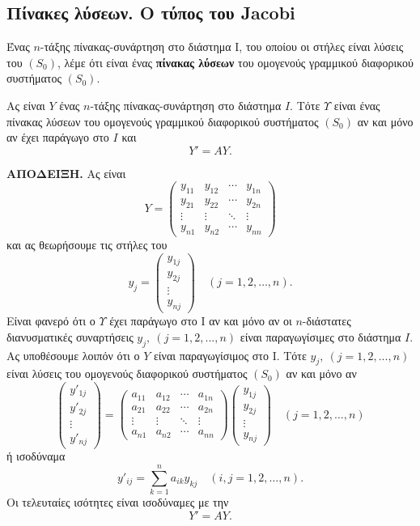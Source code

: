 \documentclass[11pt,a4paper,twoside]{book}
\newcommand{\titlefont}[1]{{\fontfamily{maksf}\selectfont #1}}
\newcounter{thewrhma}[chapter]
\renewcommand{\thethewrhma}{\thechapter.\arabic{thewrhma}}
\newcommand{\thewr}{\refstepcounter{thewrhma}{\bf\titlefont{\textcolor{secondarycolor}{\large Θεώρημα\hspace{2mm}\thethewrhma}}}\hspace{1mm}}{}
\newenvironment{Thewrhma}[1]
{\begin{tcolorbox}[title=\thewr\ \ :\ \  {\textcolor{black}{\bf{\large\titlefont{#1}}}},
breakable,
enhanced standard,
titlerule=-.2pt,
toprule=0pt, 
rightrule=0pt, 
bottomrule=0pt,
colback=white,
left=2mm,
top=1mm,
bottom=0mm,
boxrule=0pt,
colframe=white,
borderline west={1.5mm}{0pt}{secondarycolor},
leftrule=2mm,
sharp corners,
coltitle=secondarycolor]}
{\end{tcolorbox}}
\newcommand{\eng}[1]{\selectlanguage{english}#1\selectlanguage{greek}}
\begin{document}
\subsection{Πίνακες λύσεων. Ο τύπος του \eng{Jacobi}}
Ένας $n$-τάξης πίνακας-συνάρτηση στο διάστημα Ι, του οποίου οι στήλες είναι λύσεις του $(S_0)$, λέμε ότι είναι ένας \textbf{πίνακας λύσεων} του ομογενούς γραμμικού διαφορικού συστήματος $(S_0)$.
\begin{Thewrhma}{}
Ας είναι $Y$ ένας $n$-τάξης πίνακας-συνάρτηση στο διάστημα $Ι$. Τότε $Υ$ είναι ένας πίνακας λύσεων του ομογενούς γραμμικού διαφορικού συστήματος $(S_0)$ αν και μόνο αν έχει παράγωγο στο $Ι$ και
\[ Y' = AY. \]
\end{Thewrhma}

\textbf{ΑΠΟΔΕΙΞΗ.} Ας είναι
\[
Y = \begin{pmatrix}
y_{11} & y_{12} & \cdots & y_{1n} \\
y_{21} & y_{22} & \cdots & y_{2n} \\
\vdots & \vdots & \ddots & \vdots \\
y_{n1} & y_{n2} & \cdots & y_{nn}
\end{pmatrix}
\]
και ας θεωρήσουμε τις στήλες του
\[
y_j = \begin{pmatrix}
y_{1j} \\ y_{2j} \\ \vdots \\ y_{nj}
\end{pmatrix}
\quad (j=1,2,\dots,n).
\]
Είναι φανερό ότι ο $Υ$ έχει παράγωγο στο Ι αν και μόνο αν οι $n$-διάστατες διανυσματικές συναρτήσεις $y_j,\ (j=1,2,...,n)$ είναι παραγωγίσιμες στο διάστημα $Ι$. Ας υποθέσουμε λοιπόν ότι ο $Y$ είναι παραγωγίσιμος στο Ι. Τότε $y_j,\ (j=1,2,...,n)$ είναι λύσεις του ομογενούς διαφορικού συστήματος $(S_0)$ αν και μόνο αν
\[
\begin{pmatrix}
y'_{1j} \\ y'_{2j} \\ \vdots \\ y'_{nj}
\end{pmatrix}
=
\begin{pmatrix}
a_{11} & a_{12} & \cdots & a_{1n} \\
a_{21} & a_{22} & \cdots & a_{2n} \\
\vdots & \vdots & \ddots & \vdots \\
a_{n1} & a_{n2} & \cdots & a_{nn}
\end{pmatrix}
\begin{pmatrix}
y_{1j} \\ y_{2j} \\ \vdots \\ y_{nj}
\end{pmatrix}
\quad (j=1,2,\dots,n)
\]
ή ισοδύναμα
\[
y'_{ij} = \sum_{k=1}^{n} a_{ik} y_{kj} \quad (i,j=1,2,\dots,n).
\]
Οι τελευταίες ισότητες είναι ισοδύναμες με την
\[ Y' = AY. \]
\end{document}
